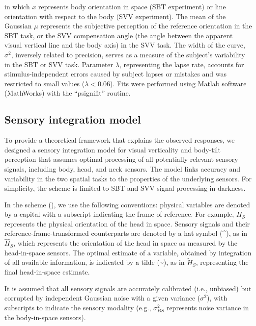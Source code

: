 in which $x$ represents body orientation in space (SBT experiment) or line orientation with respect to the body (SVV experiment). The mean of the Gaussian $\mu$ represents the subjective perception of the reference orientation in the SBT task, or the SVV compensation angle (the angle between the apparent visual vertical line and the body axis) in the SVV task. The width of the curve, $\sigma^2$, inversely related to precision, serves as a measure of the subject's variability in the SBT or SVV task. Parameter $\lambda$, representing the lapse rate, accounts for stimulus-independent errors caused by subject lapses or mistakes and was restricted to small values ($\lambda < 0.06$). Fits were performed using Matlab software (MathWorks) with the ``psignifit'' \cite{wichmann2001b} routine. 

\subsection{Sensory integration model}

To provide a theoretical framework that explains the observed responses, we designed a sensory integration model for visual verticality and body-tilt perception that assumes optimal processing of all potentially relevant sensory signals, including body, head, and neck sensors. The model links accuracy and variability in the two spatial tasks to the properties of the underlying sensors. For simplicity, the scheme is limited to SBT and SVV signal processing in darkness. 

In the scheme (), we use the following conventions: physical variables are denoted by a capital with a subscript indicating the frame of reference. For example, $H_S$ represents the physical orientation of the head in space. Sensory signals and their reference-frame-transformed counterparts are denoted by a hat symbol (\textasciicircum), as in $\hat{H}_{S}$, which represents the orientation of the head in space as measured by the head-in-space sensors. The optimal estimate of a variable, obtained by integration of all available information, is indicated by a tilde (\textasciitilde), as in $\tilde{H}_S$, representing the final head-in-space estimate. 

It is assumed that all sensory signals are accurately calibrated (i.e., unbiased) but corrupted by independent Gaussian noise with a given variance ($\sigma^2$), with subscripts to indicate the sensory modality (e.g., $\sigma_{BS}^2$ represents noise variance in the body-in-space sensors). 


